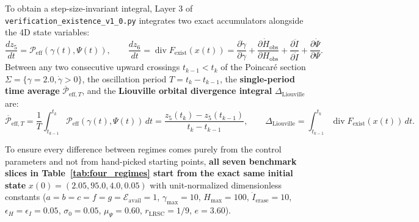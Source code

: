 \documentclass[11pt,a4paper]{article}
\theoremstyle{definition}
\begin{document}
To obtain a step-size-invariant integral, Layer 3 of \texttt{verification\_existence\_v1\_0.py} integrates two exact accumulators alongside the 4D state variables:
\begin{equation}
\label{eq:aug_integrals}
\frac{d z_5}{dt} = \mathcal{P}_{\mathrm{eff}}(\gamma(t), \Psi(t)), \qquad \frac{d z_6}{dt} = \operatorname{div} F_{\mathrm{exist}}(x(t)) = \frac{\partial \dot{\gamma}}{\partial \gamma} + \frac{\partial \dot{H}_{\mathrm{obs}}}{\partial H_{\mathrm{obs}}} + \frac{\partial \ddot{I}}{\partial \dot{I}} + \frac{\partial \dot{\Psi}}{\partial \Psi}.
\end{equation}
Between any two consecutive upward crossings $t_{k-1} < t_k$ of the Poincar\'e section $\Sigma = \{\gamma = 2.0, \dot{\gamma} > 0\}$, the oscillation period $T = t_k - t_{k-1}$, the \textbf{single-period time average} $\overline{\mathcal{P}}_{\mathrm{eff},T}$, and the \textbf{Liouville orbital divergence integral} $\Delta_{\mathrm{Liouville}}$ are:
\begin{equation}
\label{eq:period_avg_def}
\overline{\mathcal{P}}_{\mathrm{eff},T} = \frac{1}{T}\int_{t_{k-1}}^{t_k} \mathcal{P}_{\mathrm{eff}}(\gamma(t), \Psi(t))\,dt = \frac{z_5(t_k) - z_5(t_{k-1})}{t_k - t_{k-1}}, \qquad \Delta_{\mathrm{Liouville}} = \int_{t_{k-1}}^{t_k} \operatorname{div} F_{\mathrm{exist}}(x(t))\,dt.
\end{equation}

To ensure every difference between regimes comes purely from the control parameters and not from hand-picked starting points, \textbf{all seven benchmark slices in Table~\ref{tab:four_regimes} start from the exact same initial state} $x(0) = (2.05, 95.0, 4.0, 0.05)$ with unit-normalized dimensionless constants ($a=b=c=f=g=\mathcal{E}_{\mathrm{avail}}=1$, $\gamma_{\max}=10$, $H_{\max}=100$, $\dot{I}_{\mathrm{erase}}=10$, $\epsilon_H=\epsilon_I=0.05$, $\sigma_0=0.05$, $\mu_\Psi=0.60$, $r_{\mathrm{LRSC}}=1/9$, $e=3.60$).
\end{document}

